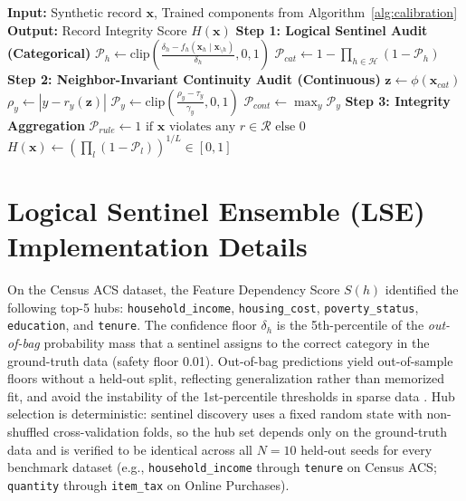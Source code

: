 \documentclass[pdflatex,sn-mathphys-num]{sn-jnl}
\theoremstyle{thmstyleone}%
\theoremstyle{thmstyletwo}%
\theoremstyle{thmstylethree}%
\begin{document}
\begin{appendices}
\begin{algorithm}[ht]
\caption{HIF Synthetic Data Audit}
\label{alg:audit}
\begin{algorithmic}[1]
\Statex \textbf{Input:} Synthetic record $\mathbf{x}$, Trained components from Algorithm~\ref{alg:calibration}
\Statex \textbf{Output:} Record Integrity Score $H(\mathbf{x})$
\State \textbf{Step 1: Logical Sentinel Audit (Categorical)}
    \State $\mathcal{P}_h \leftarrow \text{clip}\left( \frac{\delta_h - f_h(\mathbf{x}_h \mid \mathbf{x}_{\setminus h})}{\delta_h}, 0, 1 \right) $
\EndFor
\State $\mathcal{P}_{cat} \leftarrow 1 - \prod_{h \in \mathcal{H}} (1 - \mathcal{P}_h)$ 
\State \textbf{Step 2: Neighbor-Invariant Continuity Audit (Continuous)}
\State $\mathbf{z} \leftarrow \phi(\mathbf{x}_{cat})$ 
    \State $\rho_y \leftarrow |y - r_y(\mathbf{z})|$
    \State $\mathcal{P}_y \leftarrow \text{clip}\left( \frac{\rho_y - \tau_y}{\gamma_y}, 0, 1 \right)$
\EndFor
\State $\mathcal{P}_{cont} \leftarrow \max_y \mathcal{P}_y$
\State \textbf{Step 3: Integrity Aggregation}
\State $\mathcal{P}_{rule} \leftarrow 1 \text{ if } \mathbf{x} \text{ violates any } r \in \mathcal{R} \text{ else } 0$
\State $H(\mathbf{x}) \leftarrow \left( \prod_{l} (1 - \mathcal{P}_l) \right)^{1/L} \in [0, 1]$ 
\end{algorithmic}
\end{algorithm}

\section{Logical Sentinel Ensemble (LSE) Implementation Details}\label{app:lse_details}

On the Census ACS dataset, the Feature Dependency Score $S(h)$ identified the following top-5 hubs: \texttt{household\_income}, \texttt{housing\_cost}, \texttt{poverty\_status}, \texttt{education}, and \texttt{tenure}. The confidence floor $\delta_h$ is the 5th-percentile of the \emph{out-of-bag} probability mass that a sentinel assigns to the correct category in the ground-truth data (safety floor 0.01). Out-of-bag predictions yield out-of-sample floors without a held-out split, reflecting generalization rather than memorized fit, and avoid the instability of the 1st-percentile thresholds in sparse data \cite{karabulut2025neurosymbolic, long2025evaluating}. Hub selection is deterministic: sentinel discovery uses a fixed random state with non-shuffled cross-validation folds, so the hub set depends only on the ground-truth data and is verified to be identical across all $N=10$ held-out seeds for every benchmark dataset (e.g., \texttt{household\_income} through \texttt{tenure} on Census ACS; \texttt{quantity} through \texttt{item\_tax} on Online Purchases).


\end{appendices}
\end{document}

